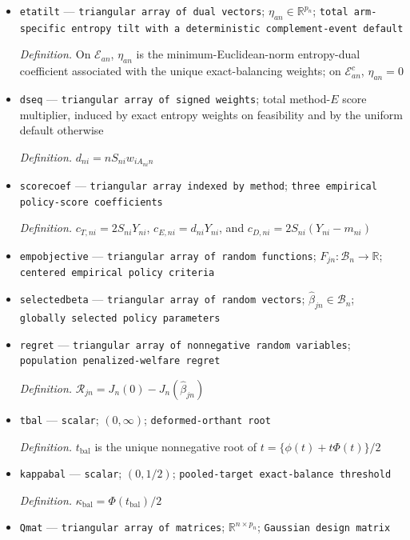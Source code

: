 \documentclass{article}
\begin{document}
\begin{itemize}
  \item \texttt{etatilt} --- \texttt{triangular array of dual vectors}; \(\eta_{an}\in\mathbb R^{p_n}\); \texttt{total arm-\allowbreak{}specific entropy tilt with a deterministic complement-\allowbreak{}event default}
  \par\smallskip\noindent\emph{Definition.} On \(\mathcal E_{an}\), \(\eta_{an}\) is the minimum-Euclidean-norm entropy-dual coefficient associated with the unique exact-balancing weights; on \(\mathcal E_{an}^{c}\), \(\eta_{an}=0\)
  \item \texttt{dseq} --- \texttt{triangular array of signed weights}; total method-\(E\) score multiplier, induced by exact entropy weights on feasibility and by the uniform default otherwise
  \par\smallskip\noindent\emph{Definition.} \(d_{ni}=nS_{ni}w_{iA_{ni}n}\)
  \item \texttt{scorecoef} --- \texttt{triangular array indexed by method}; \texttt{three empirical policy-\allowbreak{}score coefficients}
  \par\smallskip\noindent\emph{Definition.} \(c_{T,ni}=2S_{ni}Y_{ni}\), \(c_{E,ni}=d_{ni}Y_{ni}\), and \(c_{D,ni}=2S_{ni}(Y_{ni}-m_{ni})\)
  \item \texttt{empobjective} --- \texttt{triangular array of random functions}; \(F_{jn}:\mathcal B_n\to\mathbb R\); \texttt{centered empirical policy criteria}
  \item \texttt{selectedbeta} --- \texttt{triangular array of random vectors}; \(\widehat\beta_{jn}\in\mathcal B_n\); \texttt{globally selected policy parameters}
  \item \texttt{regret} --- \texttt{triangular array of nonnegative random variables}; \texttt{population penalized-\allowbreak{}welfare regret}
  \par\smallskip\noindent\emph{Definition.} \(\mathcal R_{jn}=J_n(0)-J_n(\widehat\beta_{jn})\)
  \item \texttt{tbal} --- \texttt{scalar}; \((0,\infty)\); \texttt{deformed-\allowbreak{}orthant root}
  \par\smallskip\noindent\emph{Definition.} \(t_{\mathrm{bal}}\) is the unique nonnegative root of \(t=\{\phi(t)+t\Phi(t)\}/2\)
  \item \texttt{kappabal} --- \texttt{scalar}; \((0,1/2)\); \texttt{pooled-\allowbreak{}target exact-\allowbreak{}balance threshold}
  \par\smallskip\noindent\emph{Definition.} \(\kappa_{\mathrm{bal}}=\Phi(t_{\mathrm{bal}})/2\)
  \item \texttt{Qmat} --- \texttt{triangular array of matrices}; \(\mathbb R^{n\times p_n}\); \texttt{Gaussian design matrix}

\end{itemize}
\end{document}
